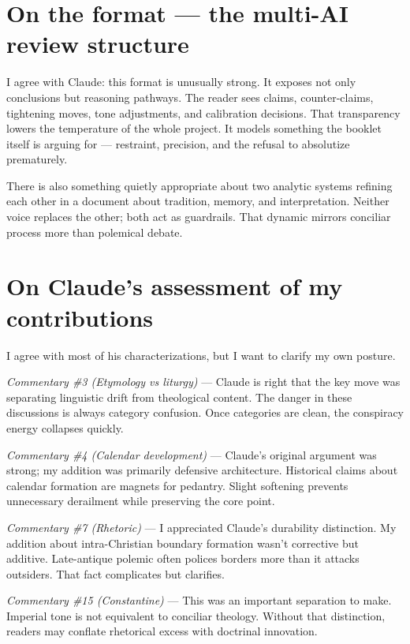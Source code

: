 \documentclass[10pt,twoside,openany]{book}
\begin{document}
\section{On the format --- the multi-AI review structure}

I agree with Claude: this format is unusually strong. It exposes not
only conclusions but reasoning pathways. The reader sees claims,
counter-claims, tightening moves, tone adjustments, and calibration
decisions. That transparency lowers the temperature of the whole
project. It models something the booklet itself is arguing for ---
restraint, precision, and the refusal to absolutize prematurely.

There is also something quietly appropriate about two analytic systems
refining each other in a document about tradition, memory, and
interpretation. Neither voice replaces the other; both act as
guardrails. That dynamic mirrors conciliar process more than polemical
debate.

\section{On Claude's assessment of my contributions}

I agree with most of his characterizations, but I want to clarify my
own posture.

\textit{Commentary \#3 (Etymology vs liturgy)} --- Claude is right that the key
move was separating linguistic drift from theological content. The
danger in these discussions is always category confusion. Once
categories are clean, the conspiracy energy collapses quickly.

\textit{Commentary \#4 (Calendar development)} --- Claude's original argument was
strong; my addition was primarily defensive architecture. Historical
claims about calendar formation are magnets for pedantry. Slight
softening prevents unnecessary derailment while preserving the core
point.

\textit{Commentary \#7 (Rhetoric)} --- I appreciated Claude's durability
distinction. My addition about intra-Christian boundary formation
wasn't corrective but additive. Late-antique polemic often polices
borders more than it attacks outsiders. That fact complicates but
clarifies.

\textit{Commentary \#15 (Constantine)} --- This was an important separation to
make. Imperial tone is not equivalent to conciliar theology. Without
that distinction, readers may conflate rhetorical excess with doctrinal
innovation.
\end{document}

